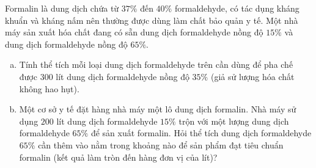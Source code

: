 \begin{bt}%
Formalin là dung dịch chứa từ $37\%$ đến $40\%$ formaldehyde, có tác dụng kháng khuẩn và kháng nấm nên thường được dùng làm chất bảo quản y tế. Một nhà máy sản xuất hóa chất đang có sẵn dung dịch formaldehyde nồng độ $15\%$ và dung dịch formaldehyde nồng độ $65\%$.
\begin{enumerate}[a)]
    \item Tính thể tích mỗi loại dung dịch formaldehyde trên cần dùng để pha chế được $300$ lít dung dịch formaldehyde nồng độ $35\%$ (giả sử lượng hóa chất không hao hụt).
    \item Một cơ sở y tế đặt hàng nhà máy một lô dung dịch formalin. Nhà máy sử dụng $200$ lít dung dịch formaldehyde $15\%$ trộn với một lượng dung dịch formaldehyde $65\%$ để sản xuất formalin. Hỏi thể tích dung dịch formaldehyde $65\%$ cần thêm vào nằm trong khoảng nào để sản phẩm đạt tiêu chuẩn formalin (kết quả làm tròn đến hàng đơn vị của lít)?
\end{enumerate}
\end{bt}
